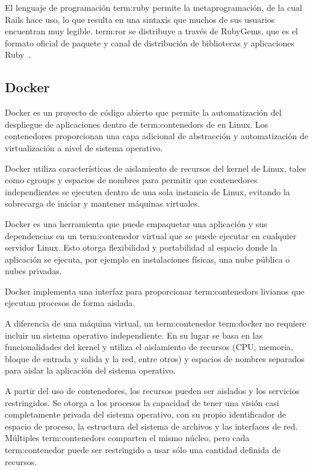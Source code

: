 El lenguaje de programación \gls{term:ruby} permite la metaprogramación, de la
cual Rails hace uso, lo que resulta en una sintaxis que muchos de sus usuarios encuentran muy legible. \gls{term:ror} se distribuye a través de RubyGems, que
es el formato oficial de paquete y canal de distribución de bibliotecas y aplicaciones Ruby~\cite{ror}.

\subsection{Docker}

Docker es un proyecto de código abierto que permite la automatización del
despliegue de aplicaciones dentro de \glspl{term:contenedor} de 
en Linux. Los contenedores proporcionan una capa adicional de abstracción y
automatización de virtualización a nivel de sistema operativo.

Docker utiliza características de aislamiento de recursos del kernel de Linux,
tales como cgroups y espacios de nombres para permitir que contenedores
independientes se ejecuten dentro de una sola instancia de Linux, evitando la
sobrecarga de iniciar y mantener máquinas virtuales.

Docker es una herramienta que puede empaquetar una aplicación y sus
dependencias en un \gls{term:contenedor} virtual que se puede ejecutar en
cualquier servidor Linux. Esto otorga flexibilidad y portabilidad al espacio
donde la aplicación se ejecuta, por ejemplo en instalaciones físicas,
una nube pública o nubes privadas.

Docker implementa una interfaz para proporcionar \glspl{term:contenedor}
livianos que ejecutan procesos de forma aislada.

A diferencia de una máquina virtual, un \gls{term:contenedor} \gls{term:docker}
no requiere incluir un sistema operativo independiente. En su lugar se basa en
las funcionalidades del kernel y utiliza el aislamiento de recursos (CPU,
memoria, bloque de entrada y salida y la red, entre otros) y espacios de nombres
separados para aislar la aplicación del sistema operativo.

A partir del uso de contenedores, los recursos pueden ser aislados y los
servicios restringidos. Se otorga a los procesos la capacidad de tener una
visión casi completamente privada del sistema operativo, con su propio
identificador de espacio de proceso, la estructura del sistema de archivos y
las interfaces de red. Múltiples \glspl{term:contenedor} comparten el mismo
núcleo, pero cada \gls{term:contenedor} puede ser restringido a usar sólo una
cantidad definida de recursos.

